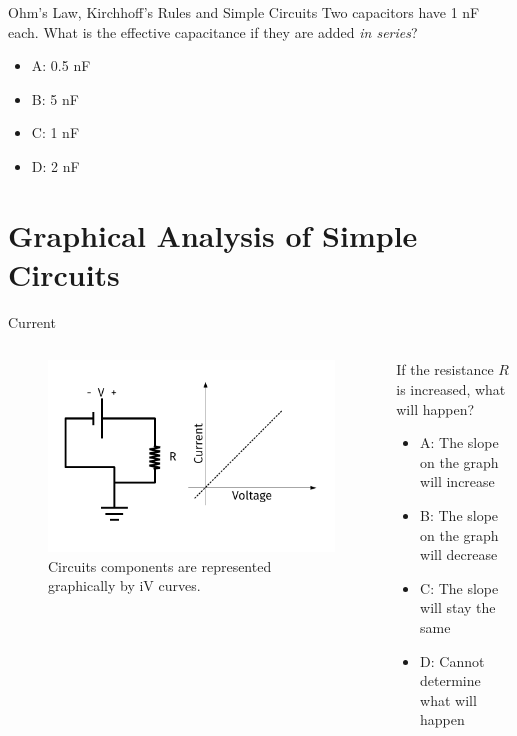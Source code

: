 \documentclass{beamer}
\begin{document}
\begin{frame}{Ohm's Law, Kirchhoff's Rules and Simple Circuits}
Two capacitors have 1 nF each.  What is the effective capacitance if they are added \textit{in series}?
\begin{itemize}
\item A: 0.5 nF
\item B: 5 nF
\item C: 1 nF
\item D: 2 nF
\end{itemize}
\end{frame}

\section{Graphical Analysis of Simple Circuits}

\begin{frame}{Current}
\begin{columns}[T]
\begin{column}{0.5\textwidth}
\begin{figure}
\centering
\includegraphics[width=\textwidth,trim=0.5cm 0cm 1cm 0cm,clip=true]{figures/iVCurve.pdf}
\caption{\label{fig:iVCurve1} Circuits components are represented graphically by iV curves.}
\end{figure}
\end{column}
\begin{column}{0.5\textwidth}
\small
If the resistance $R$ is increased, what will happen?
\begin{itemize}
\item A: The slope on the graph will increase
\item B: The slope on the graph will decrease
\item C: The slope will stay the same
\item D: Cannot determine what will happen
\end{itemize}
\end{column}
\end{columns}
\end{frame}
\end{document}
